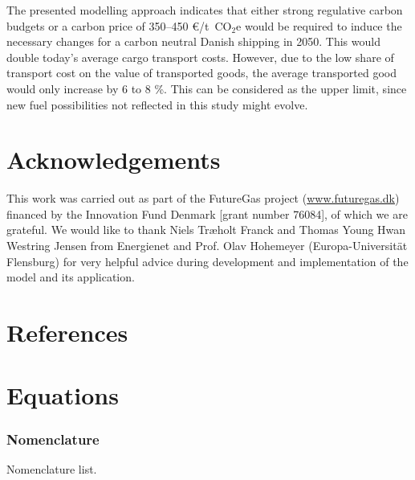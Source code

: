 \documentclass[article]{elsarticle}
\begin{document}
The presented modelling approach indicates that either strong regulative carbon budgets or a carbon price of 350--450 \euro/t~CO$_2$e would be required to induce the necessary changes for a carbon neutral Danish shipping in 2050. This would double today's average cargo transport costs. However, due to the low share of transport cost on the value of transported goods, the average transported good would only increase by 6 to 8 \%. This can be considered as the upper limit, since new fuel possibilities not reflected in this study might evolve.

\section*{Acknowledgements}
This work was carried out as part of the FutureGas project (\url{www.futuregas.dk}) financed by the Innovation Fund Denmark [grant number 76084], of which we are grateful. We would like to thank Niels Tr\ae holt Franck and Thomas Young Hwan Westring Jensen from Energienet and Prof. Olav Hohemeyer (Europa-Universit\"at Flensburg) for very helpful advice during development and implementation of the model and its application.


\section*{References}


\newpage
\appendix
\section{Equations}\label{app:equations}
\subsubsection{Nomenclature}\label{box:nomenclature}
\glsdisablehyper
\glsaddall
\begin{table}[h]
\begin{mdframed}
\footnotesize{
\begin{multicols}{2}
\printglossary[style=tree,type=a]
\vspace{-0.3cm}
\printglossary[style=tree,type=s]
\vspace{-0.3cm}
\printglossary[style=tree,type=v]
\vspace{-0.3cm}
\printglossary[style=tree,type=p]
\end{multicols}
}
\end{mdframed}
\caption*{Nomenclature list.}
\end{table}
\end{document}
